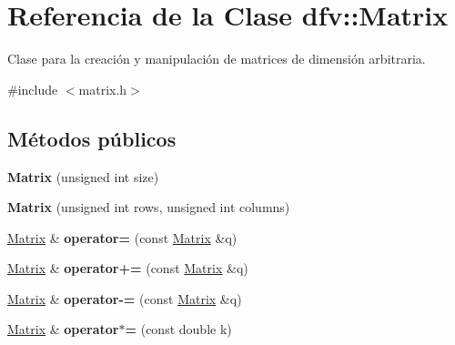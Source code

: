 \hypertarget{classdfv_1_1Matrix}{\section{\-Referencia de la \-Clase dfv\-:\-:\-Matrix}
\label{classdfv_1_1Matrix}
}


\-Clase para la creación y manipulación de matrices de dimensión arbitraria.  




{\ttfamily \#include $<$matrix.\-h$>$}

\subsection*{\-Métodos públicos}
\begin{DoxyCompactItemize}
\item 
\hypertarget{classdfv_1_1Matrix_a33930d4646e2e4fbe22f0ae360befeb4}{{\bfseries \-Matrix} (unsigned int size)}\label{classdfv_1_1Matrix_a33930d4646e2e4fbe22f0ae360befeb4}

\item 
\hypertarget{classdfv_1_1Matrix_aa929489291d7f10011aa15de8049ca5e}{{\bfseries \-Matrix} (unsigned int rows, unsigned int columns)}\label{classdfv_1_1Matrix_aa929489291d7f10011aa15de8049ca5e}

\item 
\hypertarget{classdfv_1_1Matrix_a469e6974084786e6a67e99e995d02b35}{\hyperlink{classdfv_1_1Matrix}{\-Matrix} \& {\bfseries operator=} (const \hyperlink{classdfv_1_1Matrix}{\-Matrix} \&q)}\label{classdfv_1_1Matrix_a469e6974084786e6a67e99e995d02b35}

\item 
\hypertarget{classdfv_1_1Matrix_a1dc2f6bd2f8123d60bc4682717c13050}{\hyperlink{classdfv_1_1Matrix}{\-Matrix} \& {\bfseries operator+=} (const \hyperlink{classdfv_1_1Matrix}{\-Matrix} \&q)}\label{classdfv_1_1Matrix_a1dc2f6bd2f8123d60bc4682717c13050}

\item 
\hypertarget{classdfv_1_1Matrix_a4830b9e6a392cfbb8add97b7af58c4a3}{\hyperlink{classdfv_1_1Matrix}{\-Matrix} \& {\bfseries operator-\/=} (const \hyperlink{classdfv_1_1Matrix}{\-Matrix} \&q)}\label{classdfv_1_1Matrix_a4830b9e6a392cfbb8add97b7af58c4a3}

\item 
\hypertarget{classdfv_1_1Matrix_afa9657c65f887fe13119de7ad15ab9de}{\hyperlink{classdfv_1_1Matrix}{\-Matrix} \& {\bfseries operator$\ast$=} (const double k)}\label{classdfv_1_1Matrix_afa9657c65f887fe13119de7ad15ab9de}


\end{DoxyCompactItemize}
